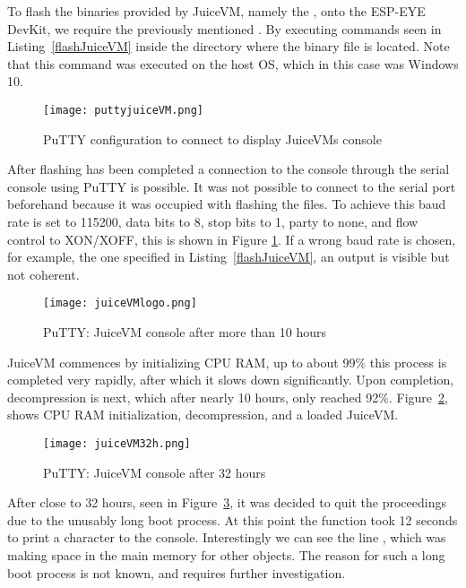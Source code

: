 To flash the binaries provided by JuiceVM, namely the , onto the ESP-EYE DevKit, we require the previously mentioned . By executing commands seen in Listing~\ref{flashJuiceVM} inside the directory where the binary file is located. Note that this command was executed on the host OS, which in this case was Windows 10.

\begin{figure}[H]
\centering
\texttt{[image: puttyjuiceVM.png]}
\caption{PuTTY configuration to connect to display JuiceVMs console}
\label{puttyjuiceVM}
\end{figure}

After flashing has been completed a connection to the console through the serial console using PuTTY is possible. It was not possible to connect to the serial port beforehand because it was occupied with flashing the files. To achieve this baud rate is set to 115200, data bits to 8, stop bits to 1, party to none, and flow control to XON/XOFF, this is shown in Figure \ref{puttyjuiceVM}. If a wrong baud rate is chosen, for example, the one specified in Listing~\ref{flashJuiceVM}, an output is visible but not coherent.

\begin{figure}[H]
\centering
\texttt{[image: juiceVMlogo.png]}
\caption{PuTTY: JuiceVM console after more than 10 hours}
\label{juiceVMlogo}
\end{figure}

JuiceVM commences by initializing CPU RAM, up to about 99\% this process is completed very rapidly, after which it slows down significantly. Upon completion, decompression is next, which after nearly 10 hours, only reached 92\%. Figure~\ref{juiceVMlogo}, shows CPU RAM initialization, decompression, and a loaded JuiceVM.

\begin{figure}[H]
\centering
\texttt{[image: juiceVM32h.png]}
\caption{PuTTY: JuiceVM console after 32 hours}
\label{juiceVM32h}
\end{figure}

After close to 32 hours, seen in Figure~\ref{juiceVM32h}, it was decided to quit the proceedings due to the unusably long boot process. At this point the  function took 12 seconds to print a character to the console. Interestingly we can see the line , which was making space in the main memory for other objects. The reason for such a long boot process is not known, and requires further investigation. 

